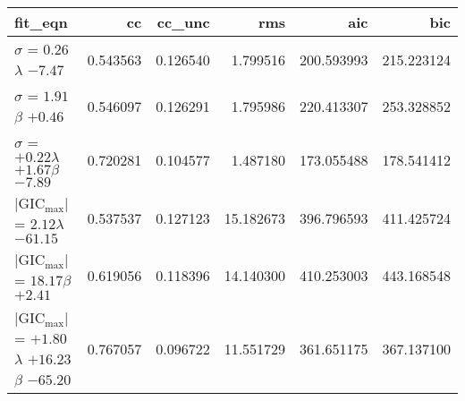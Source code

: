 \begin{tabular}{lrrrrr}
\toprule
fit_eqn & cc & cc_unc & rms & aic & bic \\
\midrule
$\sigma$ = $0.26$$\lambda$ $-7.47$ & 0.543563 & 0.126540 & 1.799516 & 200.593993 & 215.223124 \\
$\sigma$ = $1.91$$\beta$ $+0.46$ & 0.546097 & 0.126291 & 1.795986 & 220.413307 & 253.328852 \\
$\sigma$ = $+0.22$$\lambda$ $+1.67$$\beta$ $-7.89$ & 0.720281 & 0.104577 & 1.487180 & 173.055488 & 178.541412 \\
|GIC$_\text{max}$| = $2.12$$\lambda$ $-61.15$ & 0.537537 & 0.127123 & 15.182673 & 396.796593 & 411.425724 \\
|GIC$_\text{max}$| = $18.17$$\beta$ $+2.41$ & 0.619056 & 0.118396 & 14.140300 & 410.253003 & 443.168548 \\
|GIC$_\text{max}$| = $+1.80$$\lambda$ $+16.23$$\beta$ $-65.20$ & 0.767057 & 0.096722 & 11.551729 & 361.651175 & 367.137100 \\
\bottomrule
\end{tabular}
